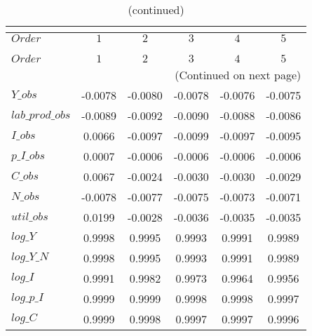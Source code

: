  
\begin{center}
\begin{longtable}{lccccc} 
\caption{COEFFICIENTS OF AUTOCORRELATION}\\
 \label{Table:th_autocorr_matrix}\\
\toprule 
$Order           $	 & 	 $          1$	 & 	 $          2$	 & 	 $          3$	 & 	 $          4$	 & 	 $          5$\\
\midrule \endfirsthead 
\caption{(continued)}\\
 \toprule \\ 
$Order           $	 & 	 $          1$	 & 	 $          2$	 & 	 $          3$	 & 	 $          4$	 & 	 $          5$\\
\midrule \endhead 
\midrule \multicolumn{6}{r}{(Continued on next page)} \\ \bottomrule \endfoot 
\bottomrule \endlastfoot 
$Y\_obs          $	 & 	    -0.0078	 & 	    -0.0080	 & 	    -0.0078	 & 	    -0.0076	 & 	    -0.0075 \\ 
$lab\_prod\_obs  $	 & 	    -0.0089	 & 	    -0.0092	 & 	    -0.0090	 & 	    -0.0088	 & 	    -0.0086 \\ 
$I\_obs          $	 & 	     0.0066	 & 	    -0.0097	 & 	    -0.0099	 & 	    -0.0097	 & 	    -0.0095 \\ 
$p\_I\_obs       $	 & 	     0.0007	 & 	    -0.0006	 & 	    -0.0006	 & 	    -0.0006	 & 	    -0.0006 \\ 
$C\_obs          $	 & 	     0.0067	 & 	    -0.0024	 & 	    -0.0030	 & 	    -0.0030	 & 	    -0.0029 \\ 
$N\_obs          $	 & 	    -0.0078	 & 	    -0.0077	 & 	    -0.0075	 & 	    -0.0073	 & 	    -0.0071 \\ 
$util\_obs       $	 & 	     0.0199	 & 	    -0.0028	 & 	    -0.0036	 & 	    -0.0035	 & 	    -0.0035 \\ 
$log\_Y          $	 & 	     0.9998	 & 	     0.9995	 & 	     0.9993	 & 	     0.9991	 & 	     0.9989 \\ 
$log\_Y\_N       $	 & 	     0.9998	 & 	     0.9995	 & 	     0.9993	 & 	     0.9991	 & 	     0.9989 \\ 
$log\_I          $	 & 	     0.9991	 & 	     0.9982	 & 	     0.9973	 & 	     0.9964	 & 	     0.9956 \\ 
$log\_p\_I       $	 & 	     0.9999	 & 	     0.9999	 & 	     0.9998	 & 	     0.9998	 & 	     0.9997 \\ 
$log\_C          $	 & 	     0.9999	 & 	     0.9998	 & 	     0.9997	 & 	     0.9997	 & 	     0.9996 \\ 

\end{longtable}
\end{center}
